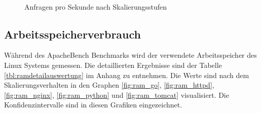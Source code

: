 \begin{figure}[]
	\captionsetup{list=no}
	\ContinuedFloat 
	\centering 
	 \\
	\caption{Anfragen pro Sekunde nach Skalierungsstufen}
\end{figure}


\subsection{Arbeitsspeicherverbrauch}
Während des ApacheBench Benchmarks wird der verwendete Arbeitsspeicher des Linux Systems gemessen. Die detaillierten Ergebnisse sind der Tabelle \ref{tbl:ramdetailauswertung} im Anhang zu entnehmen. Die Werte sind nach dem Skalierungsverhalten in den Graphen \ref{fig:ram_go}, \ref{fig:ram_httpd}, \ref{fig:ram_nginx}, \ref{fig:ram_python} und \ref{fig:ram_tomcat} visualisiert. Die Konfidenzintervalle sind in diesen Grafiken eingezeichnet.

